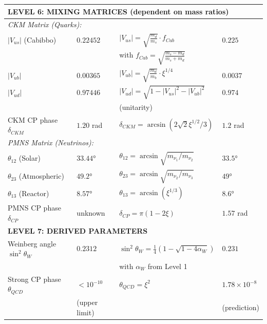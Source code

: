 \begin{longtable}{p{4.0cm}p{3.2cm}p{2.8cm}p{2.8cm}}
	\midrule
	\multicolumn{4}{l}{\textbf{LEVEL 6: MIXING MATRICES (dependent on mass ratios)}} \\
	\midrule
	
	\multicolumn{4}{l}{\textit{CKM Matrix (Quarks):}} \\
	
	$|V_{us}|$ (Cabibbo) & $0.22452$ & $|V_{us}| = \sqrt{\frac{m_d}{m_s}} \cdot f_{Cab}$ & $0.225$ \\
	& & with $f_{Cab} = \sqrt{\frac{m_s - m_d}{m_s + m_d}}$ & \\[0.3em]
	
	$|V_{ub}|$ & $0.00365$ & $|V_{ub}| = \sqrt{\frac{m_d}{m_b}} \cdot \xi^{1/4}$ & $0.0037$ \\
	
	$|V_{ud}|$ & $0.97446$ & $|V_{ud}| = \sqrt{1 - |V_{us}|^2 - |V_{ub}|^2}$ & $0.974$ \\
	& & (unitarity) & \\[0.3em]
	
	CKM CP phase $\delta_{CKM}$ & $1.20$ rad & $\delta_{CKM} = \arcsin(2\sqrt{2}\xi^{1/2}/3)$ & $1.2$ rad \\
	
	\multicolumn{4}{l}{\textit{PMNS Matrix (Neutrinos):}} \\
	
	$\theta_{12}$ (Solar) & $33.44°$ & $\theta_{12} = \arcsin\sqrt{m_{\nu_1}/m_{\nu_2}}$ & $33.5°$ \\
	
	$\theta_{23}$ (Atmospheric) & $49.2°$ & $\theta_{23} = \arcsin\sqrt{m_{\nu_2}/m_{\nu_3}}$ & $49°$ \\
	
	$\theta_{13}$ (Reactor) & $8.57°$ & $\theta_{13} = \arcsin(\xi^{1/3})$ & $8.6°$ \\
	
	PMNS CP phase $\delta_{CP}$ & unknown & $\delta_{CP} = \pi(1 - 2\xi)$ & $1.57$ rad \\
	
	\midrule
	\multicolumn{4}{l}{\textbf{LEVEL 7: DERIVED PARAMETERS}} \\
	\midrule
	
	Weinberg angle $\sin^2\theta_W$ & $0.2312$ & $\sin^2\theta_W = \frac{1}{4}(1-\sqrt{1-4\alpha_W})$ & $0.231$ \\
	& & with $\alpha_W$ from Level 1 & \\[0.3em]
	
	Strong CP phase $\theta_{QCD}$ & $< 10^{-10}$ & $\theta_{QCD} = \xi^{2}$ & $1.78 \times 10^{-8}$ \\
	& (upper limit) & & (prediction) \\
	
\end{longtable}
\normalsize

